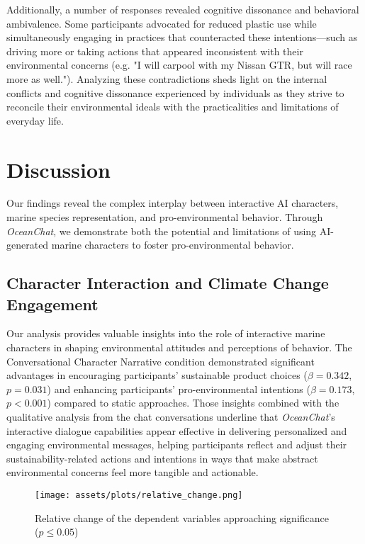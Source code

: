 \documentclass[sigconf, nonacm]{acmart}
\begin{document}
Additionally, a number of responses revealed cognitive dissonance and behavioral ambivalence. Some participants advocated for reduced plastic use while simultaneously engaging in practices that counteracted these intentions—such as driving more or taking actions that appeared inconsistent with their environmental concerns (e.g. "I will carpool with my Nissan GTR, but will race more as well."). Analyzing these contradictions sheds light on the internal conflicts and cognitive dissonance experienced by individuals as they strive to reconcile their environmental ideals with the practicalities and limitations of everyday life.

\section{Discussion}
Our findings reveal the complex interplay between interactive AI characters, marine species representation, and pro-environmental behavior. Through \textit{OceanChat}, we demonstrate both the potential and limitations of using AI-generated marine characters to foster pro-environmental behavior.

\subsection{Character Interaction and Climate Change Engagement}
Our analysis provides valuable insights into the role of interactive marine characters in shaping environmental attitudes and perceptions of behavior. The Conversational Character Narrative condition demonstrated significant advantages in encouraging participants' sustainable product choices ($\beta = 0.342$, $p = 0.031$) and enhancing participants’  pro-environmental intentions ($\beta = 0.173$, $p < 0.001$) compared to static approaches. Those insights combined with the qualitative analysis from the chat conversations underline that \textit{OceanChat}’s interactive dialogue capabilities appear effective in delivering personalized and engaging environmental messages, helping participants reflect and adjust their sustainability-related actions and intentions in ways that make abstract environmental concerns feel more tangible and actionable.
\begin{figure}
    \centering
    \texttt{[image: assets/plots/relative\_change.png]}
    \caption{Relative change of the dependent variables approaching significance ($p \leq 0.05$)}
    \label{fig:relative}
\end{figure}
\end{document}
